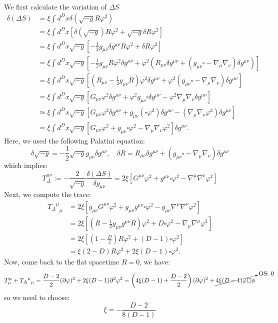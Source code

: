 \begin{solution}[25.5]
	We first calculate the variation of $\Delta S$
	\[
	\begin{aligned}\delta(\Delta S)&=\xi\int d^Dx\delta\left(\sqrt{-g}R\varphi^2\right)\\&=\xi\int d^Dx\left[\delta(\sqrt{-g})R\left.\varphi^2+\sqrt{-g}\right.\delta R\left.\varphi^2\right]\right.\\&=\xi\int d^Dx\sqrt{-g}{\left[-\frac{1}{2}g_{\mu\nu}\delta g^{\mu\nu}\right.R\left.\varphi^2+\delta R\left.\varphi^2\right]\right.}\\&=\xi\int d^Dx\sqrt{-g}{\left[-\frac{1}{2}g_{\mu\nu}R\varphi^2\delta g^{\mu\nu}+\varphi^2{\left(R_{\mu\nu}\delta g^{\mu\nu}+\left(g_{\mu\nu}\square-\nabla_\mu\nabla_\nu\right)\delta g^{\mu\nu}\right)}\right]}\\&=\xi\int d^Dx\sqrt{-g}{\left[\left(R_{\mu\nu}-\frac{1}{2}g_{\mu\nu}R\right)\varphi^2\delta g^{\mu\nu}+\varphi^2(g_{\mu\nu}\square-\nabla_\mu\nabla_\nu)\delta g^{\mu\nu}\right]}\\&=\xi\int d^Dx\sqrt{-g}{\left[G_{\mu\nu}\varphi^2\delta g^{\mu\nu}+\varphi^2g_{\mu\nu}\square\delta g^{\mu\nu}-\varphi^2\nabla_\mu\nabla_\nu\delta g^{\mu\nu}\right]}\\&\simeq\xi\int d^Dx\left.\sqrt{-g}\left[G_{\mu\nu}\varphi^2\right.\delta g^{\mu\nu}+g_{\mu\nu}\left(\square\varphi^2\right)\delta g^{\mu\nu}-\left(\nabla_\mu\nabla_\nu\varphi^2\right)\delta g^{\mu\nu}\right]\\&=\xi\int d^Dx\sqrt{-g}{\left[G_{\mu\nu}\varphi^2+g_{\mu\nu}\square\varphi^{2}-\nabla_\mu\nabla_\nu\varphi^2\right]}\delta g^{\mu\nu}.\end{aligned}
	\]
	Here, we used the following Palatini equation:
	\[
	\delta\sqrt{-g}=-\frac{1}{2}\sqrt{-g}g_{\mu\nu}\delta g^{\mu\nu},\quad
	\delta R=R_{\mu\nu}\delta g^{\mu\nu}+(g_{\mu\nu}\square-\nabla_\mu\nabla_\nu)\delta g^{\mu\nu}
	\]
	which implies:
	\[
		T_\Delta^{\mu\nu}:=-\frac{2}{\sqrt{-g}}\frac{\delta(\Delta S)}{\delta g_{\mu\nu}}=2\xi{\left[G^{\mu\nu}\varphi^2+g^{\mu\nu}\square\varphi^2-\nabla^\mu\nabla^\nu\varphi^2\right]}
	\]
	Next, we compute the trace:
	\[
	\begin{aligned}{{T_\Delta}^{\mu}}_{\mu}&=2\xi\left[g_{\mu\nu}G^{\mu\nu}\varphi^2+g_{\mu\nu}g^{\mu\nu}\square\varphi^2-g_{\mu\nu}\nabla^{\mu}\nabla^{\nu}\varphi^2\right]\\&=2\xi\left[\left(R-\frac{1}{2}g_{\mu\nu}g^{\mu\nu}R\right)\varphi^2+D\square\varphi^2-\nabla_\mu\nabla^\mu\varphi^2\right]\\&=2\xi\left[\left(1-\frac{D}{2}\right)R\varphi^2+(D-1)\square\varphi^2\right]\\&=\xi(2-D)R\varphi^2+2\xi(D-1)\square\varphi^2.\end{aligned}
	\]
	Now, come back to the flat spacetime $R=0$, we have:
	\[
	T^\mu_\mu+{{T_\Delta}^{\mu}}_{\mu}=\frac{D-2}{2}(\partial\varphi)^2+2\xi(D-1)\partial^2\varphi^{2}=\left(4\xi(D-1)+\frac{D-2}{2}\right)(\partial\varphi)^2+\cancelto{\text{OS: }0}{4\xi(D-1)\varphi\square\phi}
	\]
	so we need to choose:
	\[
	\boxed{
	\xi =-\frac{D-2}{8(D-1)}
	}
	\]
\end{solution}

